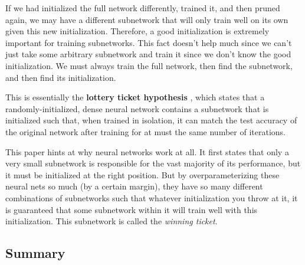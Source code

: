 \documentclass{article}
\begin{document}
    If we had initialized the full network differently, trained it, and then pruned again, we may have a different subnetwork that will only train well on its own given this new initialization. Therefore, a good initialization is extremely important for training subnetworks. This fact doesn't help much since we can't just take some arbitrary subnetwork and train it since we don't know the good initialization. We must always train the full network, then find the subnetwork, and then find its initialization. 

    This is essentially the \textbf{lottery ticket hypothesis} \cite{frankle2019lottery}, which states that a randomly-initialized, dense neural network contains a subnetwork that is initialized such that, when trained in isolation, it can match the test accuracy of the original network after training for at must the same number of iterations. 

    This paper hints at why neural networks work at all. It first states that only a very small subnetwork is responsible for the vast majority of its performance, but it must be initialized at the right position. But by overparameterizing these neural nets so much (by a certain margin), they have so many different combinations of subnetworks such that whatever initialization you throw at it, it is guaranteed that some subnetwork within it will train well with this initialization. This subnetwork is called the \textit{winning ticket}. 

  \subsection{Summary}
\end{document}
